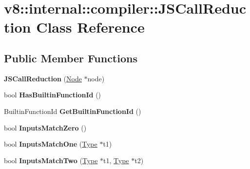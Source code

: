 \hypertarget{classv8_1_1internal_1_1compiler_1_1_j_s_call_reduction}{}\section{v8\+:\+:internal\+:\+:compiler\+:\+:J\+S\+Call\+Reduction Class Reference}
\label{classv8_1_1internal_1_1compiler_1_1_j_s_call_reduction}
\subsection*{Public Member Functions}
\begin{DoxyCompactItemize}
\item 
{\bfseries J\+S\+Call\+Reduction} (\hyperlink{classv8_1_1internal_1_1compiler_1_1_node}{Node} $\ast$node)\hypertarget{classv8_1_1internal_1_1compiler_1_1_j_s_call_reduction_ac9de2a0870d608d855face149bf17c2d}{}\label{classv8_1_1internal_1_1compiler_1_1_j_s_call_reduction_ac9de2a0870d608d855face149bf17c2d}

\item 
bool {\bfseries Has\+Builtin\+Function\+Id} ()\hypertarget{classv8_1_1internal_1_1compiler_1_1_j_s_call_reduction_a482e33ac34fd0595e74ababead383384}{}\label{classv8_1_1internal_1_1compiler_1_1_j_s_call_reduction_a482e33ac34fd0595e74ababead383384}

\item 
Builtin\+Function\+Id {\bfseries Get\+Builtin\+Function\+Id} ()\hypertarget{classv8_1_1internal_1_1compiler_1_1_j_s_call_reduction_a85fb5a04cd2d665cc21f8a0874e425a6}{}\label{classv8_1_1internal_1_1compiler_1_1_j_s_call_reduction_a85fb5a04cd2d665cc21f8a0874e425a6}

\item 
bool {\bfseries Inputs\+Match\+Zero} ()\hypertarget{classv8_1_1internal_1_1compiler_1_1_j_s_call_reduction_a1d1fdab565847beaed32f31160f08040}{}\label{classv8_1_1internal_1_1compiler_1_1_j_s_call_reduction_a1d1fdab565847beaed32f31160f08040}

\item 
bool {\bfseries Inputs\+Match\+One} (\hyperlink{classv8_1_1internal_1_1_type}{Type} $\ast$t1)\hypertarget{classv8_1_1internal_1_1compiler_1_1_j_s_call_reduction_ab53dd07e27d28119a5fcd2c69c19b323}{}\label{classv8_1_1internal_1_1compiler_1_1_j_s_call_reduction_ab53dd07e27d28119a5fcd2c69c19b323}

\item 
bool {\bfseries Inputs\+Match\+Two} (\hyperlink{classv8_1_1internal_1_1_type}{Type} $\ast$t1, \hyperlink{classv8_1_1internal_1_1_type}{Type} $\ast$t2)\hypertarget{classv8_1_1internal_1_1compiler_1_1_j_s_call_reduction_a34208d01f27e9d4d3a49d1098f82ddce}{}\label{classv8_1_1internal_1_1compiler_1_1_j_s_call_reduction_a34208d01f27e9d4d3a49d1098f82ddce}


\end{DoxyCompactItemize}
